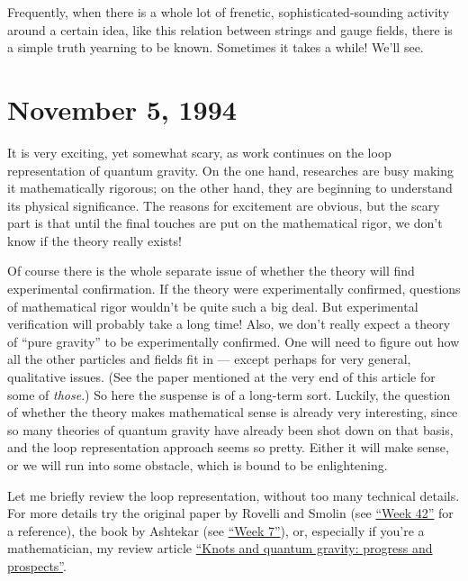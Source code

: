 \documentclass{article}
\def\tightlist{}
\renewcommand{\texttt}[1]{%
  \begingroup
  \ttfamily
  \begingroup\lccode`~=`/\lowercase{\endgroup\def~}{/\discretionary{}{}{}}%
  \begingroup\lccode`~=`[\lowercase{\endgroup\def~}{[\discretionary{}{}{}}%
  \begingroup\lccode`~=`.\lowercase{\endgroup\def~}{.\discretionary{}{}{}}%
  \catcode`/=\active\catcode`[=\active\catcode`.=\active
  \scantokens{#1\noexpand}%
  \endgroup
}
\begin{document}
\noindent
Frequently, when there is a whole lot of frenetic,
sophisticated-sounding activity around a certain idea, like this
relation between strings and gauge fields, there is a simple truth
yearning to be known. Sometimes it takes a while! We'll see.



\hypertarget{week43}{%
\section{November 5, 1994}\label{week43}}

It is very exciting, yet somewhat scary, as work continues on the loop
representation of quantum gravity. On the one hand, researches are busy
making it mathematically rigorous; on the other hand, they are beginning
to understand its physical significance. The reasons for excitement are
obvious, but the scary part is that until the final touches are put on
the mathematical rigor, we don't know if the theory really exists!

Of course there is the whole separate issue of whether the theory will
find experimental confirmation. If the theory were experimentally
confirmed, questions of mathematical rigor wouldn't be quite such a big
deal. But experimental verification will probably take a long time!
Also, we don't really expect a theory of ``pure gravity'' to be
experimentally confirmed. One will need to figure out how all the other
particles and fields fit in --- except perhaps for very general,
qualitative issues. (See the paper mentioned at the very end of this
article for some of \emph{those}.) So here the suspense is of a
long-term sort. Luckily, the question of whether the theory makes
mathematical sense is already very interesting, since so many theories
of quantum gravity have already been shot down on that basis, and the
loop representation approach seems so pretty. Either it will make sense,
or we will run into some obstacle, which is bound to be enlightening.

Let me briefly review the loop representation, without too many
technical details. For more details try the original paper by Rovelli
and Smolin (see \protect\hyperlink{week42}{``Week 42''} for a
reference), the book by Ashtekar (see \protect\hyperlink{week7}{``Week
7''}), or, especially if you're a mathematician, my review article
\href{http://math.ucr.edu/home/baez/knot.ps}{``Knots and quantum
gravity: progress and prospects''}.
\end{document}

